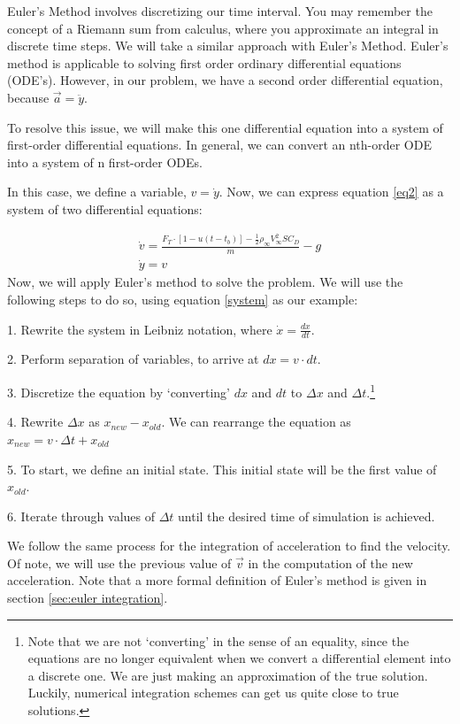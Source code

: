 \documentclass[12pt]{report}
\begin{document}
Euler’s Method involves discretizing our time interval. You may remember the concept of a Riemann sum from calculus, where you approximate an integral in discrete time steps. We will take a similar approach with Euler’s Method. Euler’s method is applicable to solving first order ordinary differential equations (ODE’s). However, in our problem, we have a second order differential equation, because $\vec{a}=\ddot{y}$.

To resolve this issue, we will make this one differential equation into a system of first-order differential equations. In general, we can convert an nth-order ODE into a system of n first-order ODEs.

In this case, we define a variable, $v=\dot{y}$. Now, we can express equation \eqref{eq2} as a system of two differential equations:

\begin{gather}\label{system}
        \dot{v}=\frac{F_T \cdot [1-u(t-t_b)]-\frac{1}{2}\rho_{\infty}V_{\infty}^2SC_D}{m}-g\\
    \dot{y}=v
\end{gather}
Now, we will apply Euler’s method to solve the problem. We will use the following steps to do so, using equation \eqref{system} as our example:

1. Rewrite the system in Leibniz notation, where $\dot{x}=\frac{dx}{dt}$.

2. Perform separation of variables, to arrive at $dx=v\cdot dt$.

3. Discretize the equation by ‘converting’  $dx$ and $dt$ to $\Delta x$ and $\Delta t$.\footnote{Note that we are not ‘converting’ in the sense of an equality, since the equations are no longer equivalent when we convert a differential element into a discrete one. We are just making an approximation of the true solution. Luckily, numerical integration schemes can get us quite close to true solutions. }

4. Rewrite $\Delta x$ as $x_{new}-x_{old}$. We can rearrange the equation as $x_{new}=v\cdot \Delta t + x_{old}$

5. To start, we define an initial state. This initial state will be the first value of $x_{old}$. 

6. Iterate through values of $\Delta t$ until the desired time of simulation is achieved.

We follow the same process for the integration of acceleration to find the velocity. Of note, we will use the previous value of $\vec{v}$ in the computation of the new acceleration. Note that a more formal definition of Euler’s method is given in section \ref{sec:euler integration}.
\end{document}
